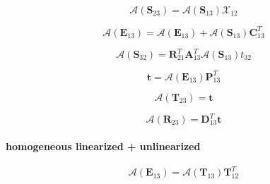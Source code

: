 \begin{equation}
\mathcal{A}(\mathbf{S}_{23}) = \mathcal{A}(\mathbf{S}_{13})\mathcal{X}_{12}
\label{eq:adding-downward-adjoint_of_tangent_linear-unlinearized_p_homogeneous_linearized-S23_a}
\end{equation}

\begin{equation}
\mathcal{A}(\mathbf{E}_{13}) = \mathcal{A}(\mathbf{E}_{13}) + \mathcal{A}(\mathbf{S}_{13})\mathbf{C}^{T}_{13}
\label{eq:adding-downward-adjoint_of_tangent_linear-unlinearized_p_homogeneous_linearized-E13_a3}
\end{equation}

\begin{equation}
\mathcal{A}(\mathbf{S}_{32}) = \mathbf{R}^{T}_{21}\mathbf{A}^{T}_{13}\mathcal{A}(\mathbf{S}_{13})t_{32}
\label{eq:adding-downward-adjoint_of_tangent_linear-unlinearized_p_homogeneous_linearized-S32_a}
\end{equation}

\begin{equation}
\mathbf{t} = \mathcal{A}(\mathbf{E}_{13})\mathbf{P}^{T}_{13}
\label{eq:adding-downward-adjoint_of_tangent_linear-unlinearized_p_homogeneous_linearized-t}
\end{equation}

\begin{equation}
\mathcal{A}(\mathbf{T}_{23}) = \mathbf{t}
\label{eq:adding-downward-adjoint_of_tangent_linear-unlinearized_p_homogeneous_linearized-T23_a}
\end{equation}

\begin{equation}
\mathcal{A}(\mathbf{R}_{23}) = \mathbf{D}^{T}_{13}\mathbf{t}
\label{eq:adding-downward-adjoint_of_tangent_linear-unlinearized_p_homogeneous_linearized-R23_a}
\end{equation}


\paragraph{homogeneous linearized + unlinearized}
\label{sec:adding-downward-adjoint_of_tangent_linear-homogeneous_linearized_p_unlinearized}

\begin{equation}
\mathcal{A}(\mathbf{E}_{13}) = \mathcal{A}(\mathbf{T}_{13})\mathbf{T}^{T}_{12}
\label{eq:adding-downward-adjoint_of_tangent_linear-homogeneous_linearized_p_unlinearized-E13_a}
\end{equation}


